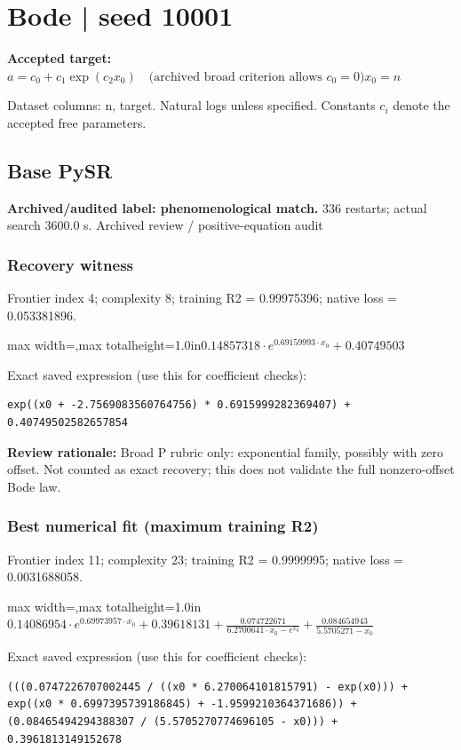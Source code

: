 \documentclass[10pt,letterpaper,landscape]{article}
\begin{document}
\section*{Bode | seed 10001}
\textbf{Accepted target:} $\displaystyle a=c_0+c_1\exp(c_2x_0)\quad\text{(archived broad criterion allows }c_0=0\text{)}$\hfill $x_0=n$\par
{\small Dataset columns: n, target. Natural logs unless specified. Constants $c_i$ denote the accepted free parameters.}\par\medskip
\begin{minipage}[t]{0.485\textwidth}
\subsection*{Base PySR}
\textbf{Archived/audited label: phenomenological match.} 336 restarts; actual search 3600.0 s.
{\small Archived review / positive-equation audit}
\subsubsection*{Recovery witness}
Frontier index 4; complexity 8; training R2 = 0.99975396; native loss = 0.053381896.
\begin{center}\begin{adjustbox}{max width=\linewidth,max totalheight=1.0in}$\displaystyle 0.14857318 \cdot e^{0.69159993 \cdot x_{0}} + 0.40749503$\end{adjustbox}\end{center}
{\scriptsize Exact saved expression (use this for coefficient checks):}
\begin{lstlisting}
exp((x0 + -2.7569083560764756) * 0.6915999282369407) + 0.40749502582657854
\end{lstlisting}
{\small\textbf{Review rationale:} Broad P rubric only: exponential family, possibly with zero offset. Not counted as exact recovery; this does not validate the full nonzero-offset Bode law.}
\subsubsection*{Best numerical fit (maximum training R2)}
Frontier index 11; complexity 23; training R2 = 0.9999995; native loss = 0.0031688058.
\begin{center}\begin{adjustbox}{max width=\linewidth,max totalheight=1.0in}$\displaystyle 0.14086954 \cdot e^{0.69973957 \cdot x_{0}} + 0.39618131 + \frac{0.074722671}{6.2700641 \cdot x_{0} - e^{x_{0}}} + \frac{0.084654943}{5.5705271 - x_{0}}$\end{adjustbox}\end{center}
{\scriptsize Exact saved expression (use this for coefficient checks):}
\begin{lstlisting}
(((0.0747226707002445 / ((x0 * 6.270064101815791) - exp(x0))) + exp((x0 * 0.6997395739186845) + -1.9599210364371686)) + (0.08465494294388307 / (5.5705270774696105 - x0))) + 0.3961813149152678
\end{lstlisting}
\end{minipage}\hfill
\end{document}
